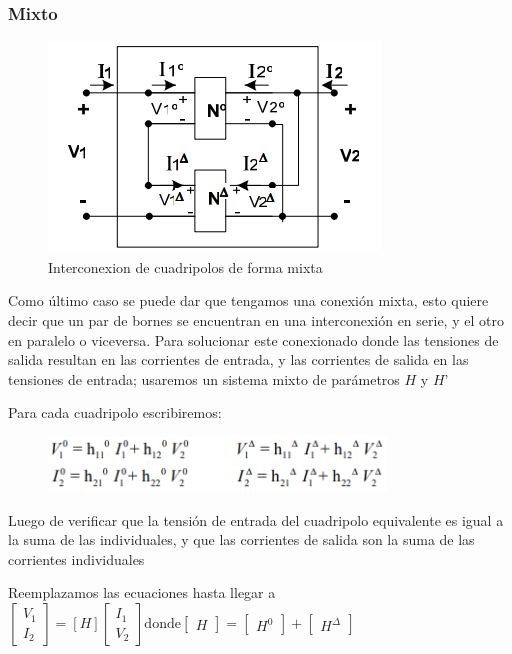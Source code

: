 \documentclass[../main.tex]{subfiles}
\begin{document}
{		\subsubsection{Mixto}
		\begin{figure}[H]
			\centering
			\includegraphics[width=\textwidth]{imagen9.png}
			\caption{Interconexion de cuadripolos de forma mixta}
		\end{figure}
		Como último caso se puede dar que tengamos una conexión mixta, esto quiere
		decir que un par de bornes se encuentran en una interconexión en serie,
		y el otro en paralelo o viceversa. Para solucionar este conexionado donde
		las tensiones de salida resultan en las corrientes de entrada, y las
		corrientes de salida en las tensiones de entrada; usaremos un sistema 
		mixto de parámetros $H$ y $H’$

		Para cada cuadripolo escribiremos:	
		\begin{figure}[H]
			\centering
			\includegraphics[width=0.8\textwidth]{imagen10.png}
		\end{figure}

		Luego de verificar que la tensión de entrada del cuadripolo equivalente
		es igual a la suma de las individuales, y que las corrientes de salida 
		son la suma de las corrientes individuales

		Reemplazamos las ecuaciones hasta llegar a 
		\(
		\begin{bmatrix} V_1 \\ I_2 \end{bmatrix} = [H] \begin{bmatrix} I_1 \\ V_2 \end{bmatrix}
		\text{donde}
		\begin{bmatrix} H \end{bmatrix} 
			=
		\begin{bmatrix} H^0 \end{bmatrix} 
			+
		\begin{bmatrix} H^{\Delta} \end{bmatrix} 
		\)


}
\end{document}
